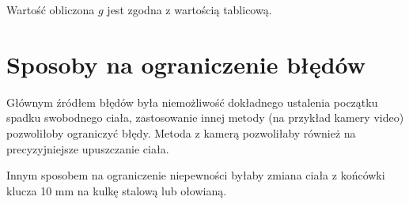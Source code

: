 \documentclass[a4paper,12pt]{article}
\begin{document}
Wartość obliczona $g$ jest zgodna z wartością tablicową.

\section{Sposoby na ograniczenie błędów}

Głównym źródłem błędów była niemożliwość dokładnego ustalenia początku spadku
swobodnego ciała, zastosowanie innej metody (na przykład kamery video)
pozwoliłoby ograniczyć błędy. Metoda z kamerą pozwoliłaby również na
precyzyjniejsze upuszczanie ciała.

Innym sposobem na ograniczenie niepewności byłaby zmiana ciała z końcówki
klucza 10 mm na kulkę stalową lub ołowianą.
\end{document}

